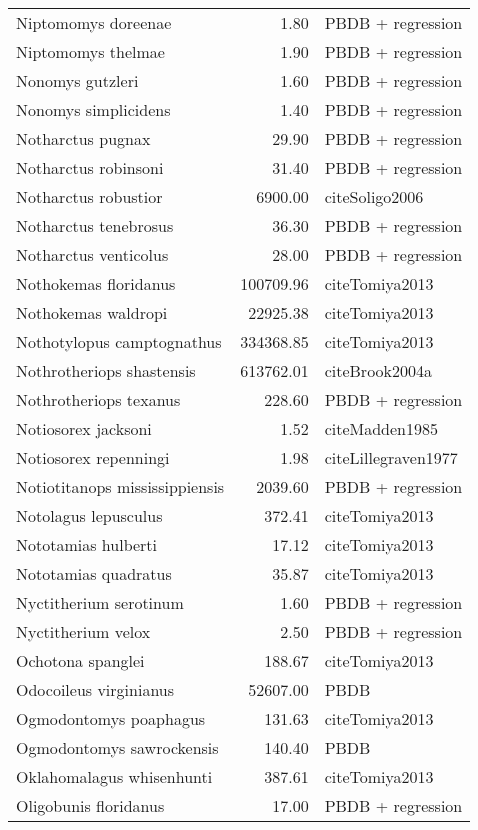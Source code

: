 \begin{table}[ht]
\begin{tabular}{lrl}
  Niptomomys doreenae & 1.80 & PBDB + regression \\ 
  Niptomomys thelmae & 1.90 & PBDB + regression \\ 
  Nonomys gutzleri & 1.60 & PBDB + regression \\ 
  Nonomys simplicidens & 1.40 & PBDB + regression \\ 
  Notharctus pugnax & 29.90 & PBDB + regression \\ 
  Notharctus robinsoni & 31.40 & PBDB + regression \\ 
  Notharctus robustior & 6900.00 & cite{Soligo2006} \\ 
  Notharctus tenebrosus & 36.30 & PBDB + regression \\ 
  Notharctus venticolus & 28.00 & PBDB + regression \\ 
  Nothokemas floridanus & 100709.96 & cite{Tomiya2013} \\ 
  Nothokemas waldropi & 22925.38 & cite{Tomiya2013} \\ 
  Nothotylopus camptognathus & 334368.85 & cite{Tomiya2013} \\ 
  Nothrotheriops shastensis & 613762.01 & cite{Brook2004a} \\ 
  Nothrotheriops texanus & 228.60 & PBDB + regression \\ 
  Notiosorex jacksoni & 1.52 & cite{Madden1985} \\ 
  Notiosorex repenningi & 1.98 & cite{Lillegraven1977} \\ 
  Notiotitanops mississippiensis & 2039.60 & PBDB + regression \\ 
  Notolagus lepusculus & 372.41 & cite{Tomiya2013} \\ 
  Nototamias hulberti & 17.12 & cite{Tomiya2013} \\ 
  Nototamias quadratus & 35.87 & cite{Tomiya2013} \\ 
  Nyctitherium serotinum & 1.60 & PBDB + regression \\ 
  Nyctitherium velox & 2.50 & PBDB + regression \\ 
  Ochotona spanglei & 188.67 & cite{Tomiya2013} \\ 
  Odocoileus virginianus & 52607.00 & PBDB \\ 
  Ogmodontomys poaphagus & 131.63 & cite{Tomiya2013} \\ 
  Ogmodontomys sawrockensis & 140.40 & PBDB \\ 
  Oklahomalagus whisenhunti & 387.61 & cite{Tomiya2013} \\ 
  Oligobunis floridanus & 17.00 & PBDB + regression \\ 

\end{tabular}
\end{table}
